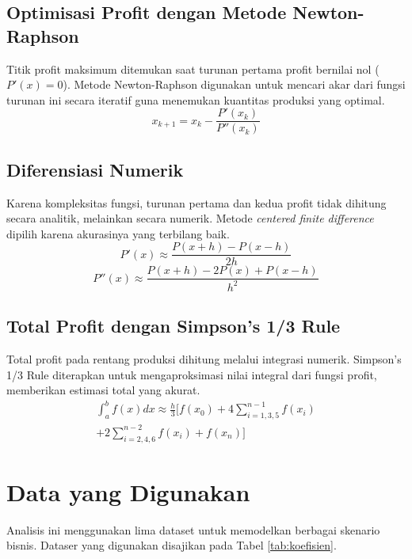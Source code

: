 \documentclass[conference]{IEEEtran}
\begin{document}
\subsection{Optimisasi Profit dengan Metode Newton-Raphson}
Titik profit maksimum ditemukan saat turunan pertama profit bernilai nol ($P'(x)=0$). Metode Newton-Raphson digunakan untuk mencari akar dari fungsi turunan ini secara iteratif guna menemukan kuantitas produksi yang optimal.
\begin{equation}
x_{k+1} = x_k - \frac{P'(x_k)}{P''(x_k)}
\end{equation}

\subsection{Diferensiasi Numerik}
Karena kompleksitas fungsi, turunan pertama dan kedua profit tidak dihitung secara analitik, melainkan secara numerik. Metode \textit{centered finite difference} dipilih karena akurasinya yang terbilang baik.
\begin{equation}
P'(x) \approx \frac{P(x+h) - P(x-h)}{2h}
\end{equation}
\begin{equation}
P''(x) \approx \frac{P(x+h) - 2P(x) + P(x-h)}{h^2}
\end{equation}

\subsection{Total Profit dengan Simpson's 1/3 Rule}
Total profit pada rentang produksi dihitung melalui integrasi numerik. Simpson's 1/3 Rule diterapkan untuk mengaproksimasi nilai integral dari fungsi profit, memberikan estimasi total yang akurat.
\begin{multline}
\int_{a}^{b} f(x) dx \approx \frac{h}{3} \Big[ f(x_0) + 4\sum_{i=1,3,5}^{n-1} f(x_i) \\
+ 2\sum_{i=2,4,6}^{n-2} f(x_i) + f(x_n) \Big]
\end{multline}

\section{Data yang Digunakan}
Analisis ini menggunakan lima dataset untuk memodelkan berbagai skenario bisnis. Dataser yang digunakan disajikan pada Tabel \ref{tab:koefisien}.
\end{document}
